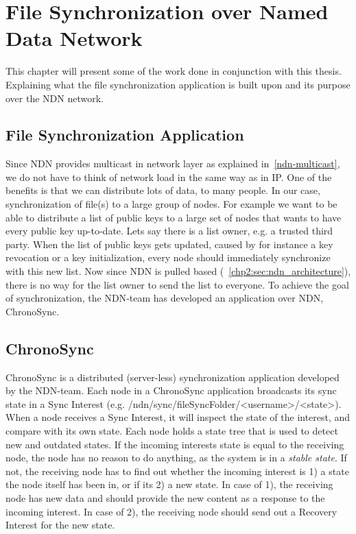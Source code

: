 \chapter{File Synchronization over Named Data Network}\label{chp3:application}
This chapter will present some of the work done in conjunction with this thesis. 
Explaining what the file synchronization application is built upon and its purpose over the \gls{NDN} network. 

\section{File Synchronization Application}\label{file-sync}
Since \gls{NDN} provides multicast in network layer as explained in~\autoref{ndn-multicast}, we do not have to think of network load in the same way as in \gls{IP}.  
One of the benefits is that we can distribute lots of data, to many people. 
In our case, synchronization of file(s) to a large group of nodes. 
For example we want to be able to distribute a list of public keys to a large set of nodes that wants to have every public key up-to-date.
Lets say there is a list owner, e.g. a trusted third party. 
When the list of public keys gets updated, caused by for instance a key revocation or a key initialization, every node should immediately synchronize with this new list.
Now since \gls{NDN} is pulled based (~\autoref{chp2:sec:ndn_architecture}), there is no way for the list owner to send the list to everyone.
To achieve the goal of synchronization, the \gls{NDN}-team has developed an application over \gls{NDN}, ChronoSync.

\section{ChronoSync}\label{chronosync}
ChronoSync is a distributed (server-less) synchronization application developed by the \gls{NDN}-team. 
Each node in a ChronoSync application broadcasts its sync state in a Sync Interest (e.g. /ndn/sync/fileSyncFolder/<username>/<state>).
When a node receives a Sync Interest, it will inspect the state of the interest, and compare with its own state.
Each node holds a state tree that is used to detect new and outdated states.
If the incoming interests state is equal to the receiving node, the node has no reason to do anything, as the system is in a \textit{stable state}.
If not, the receiving node has to find out whether the incoming interest is 1) a state the node itself has been in, or if its 2) a new state.
In case of 1), the receiving node has new data and should provide the new content as a response to the incoming interest. In case of 2), the receiving node should send out a Recovery Interest for the new state.


